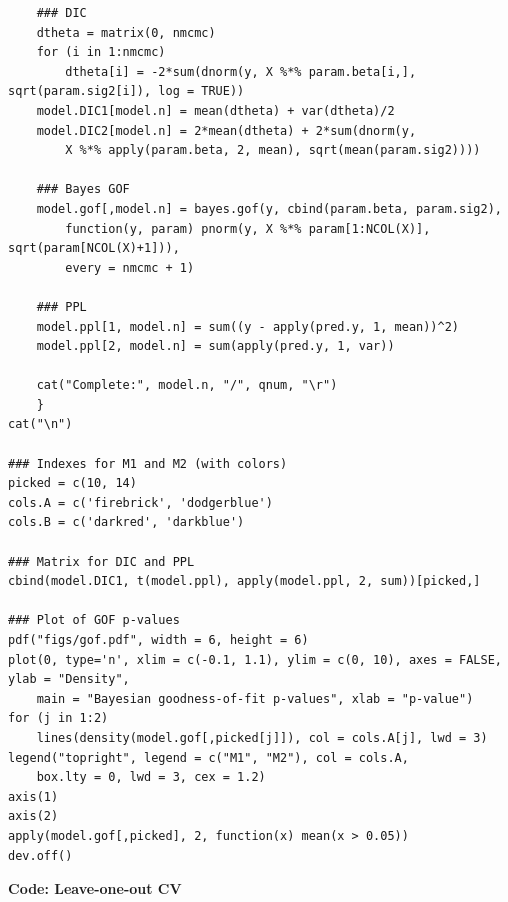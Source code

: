 \documentclass{asaproc}
\begin{document}
\begin{scriptsize}
\begin{verbatim}
    ### DIC
    dtheta = matrix(0, nmcmc)
    for (i in 1:nmcmc)
        dtheta[i] = -2*sum(dnorm(y, X %*% param.beta[i,], sqrt(param.sig2[i]), log = TRUE))
    model.DIC1[model.n] = mean(dtheta) + var(dtheta)/2
    model.DIC2[model.n] = 2*mean(dtheta) + 2*sum(dnorm(y,
        X %*% apply(param.beta, 2, mean), sqrt(mean(param.sig2))))

    ### Bayes GOF
    model.gof[,model.n] = bayes.gof(y, cbind(param.beta, param.sig2),
        function(y, param) pnorm(y, X %*% param[1:NCOL(X)], sqrt(param[NCOL(X)+1])),
        every = nmcmc + 1)

    ### PPL
    model.ppl[1, model.n] = sum((y - apply(pred.y, 1, mean))^2)
    model.ppl[2, model.n] = sum(apply(pred.y, 1, var))

    cat("Complete:", model.n, "/", qnum, "\r")
    }
cat("\n")

### Indexes for M1 and M2 (with colors)
picked = c(10, 14)
cols.A = c('firebrick', 'dodgerblue')
cols.B = c('darkred', 'darkblue')

### Matrix for DIC and PPL
cbind(model.DIC1, t(model.ppl), apply(model.ppl, 2, sum))[picked,]

### Plot of GOF p-values
pdf("figs/gof.pdf", width = 6, height = 6)
plot(0, type='n', xlim = c(-0.1, 1.1), ylim = c(0, 10), axes = FALSE, ylab = "Density",
    main = "Bayesian goodness-of-fit p-values", xlab = "p-value")
for (j in 1:2)
    lines(density(model.gof[,picked[j]]), col = cols.A[j], lwd = 3)
legend("topright", legend = c("M1", "M2"), col = cols.A,
    box.lty = 0, lwd = 3, cex = 1.2)
axis(1)
axis(2)
apply(model.gof[,picked], 2, function(x) mean(x > 0.05))
dev.off()
\end{verbatim}
\end{scriptsize}

\bigskip
\bigskip

\noindent \textbf{Code: Leave-one-out CV}
\end{document}
